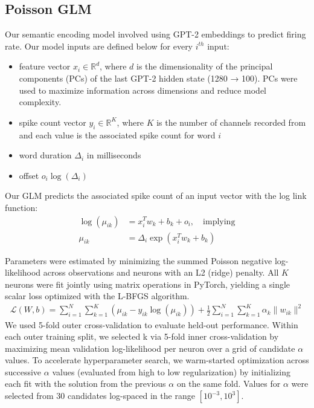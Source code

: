 \documentclass[pdflatex,sn-basic]{sn-jnl}%
\theoremstyle{thmstyleone}%
\theoremstyle{thmstyletwo}%
\theoremstyle{thmstylethree}%
\begin{document}
\subsection{Poisson GLM}\label{subsec8}
Our semantic encoding model involved using GPT-2 embeddings to predict firing rate. Our model inputs are defined below for every $i^{th}$ input:
\begin{itemize}[leftmargin=5em,label=\textendash,itemsep=3pt,topsep=4pt]
  \item feature vector $x_{i}\in \mathbb{R}^d$, where $d$ is the dimensionality of the principal components (PCs) of the last GPT-2 hidden state (1280 → 100). PCs were used to maximize information across dimensions and reduce model complexity.
  \item spike count vector $y_{i}\in \mathbb{R}^K$, where $K$ is the number of channels recorded from and each value is the associated spike count for word $i$
  \item word duration $\Delta_{i}$ in milliseconds
  \item offset $o_i\log(\Delta_i)$
\end{itemize}

Our GLM predicts the associated spike count of an input vector with the log link function:
\[
\begin{aligned}
\log(\mu_{ik}) &= x_i^T w_k + b_k + o_i, \quad \text{implying} \\
\mu_{ik} &= \Delta_i \exp(x_i^T w_k + b_k)
\end{aligned}
\]

Parameters were estimated by minimizing the summed Poisson negative log-likelihood across observations and neurons with an L2 (ridge) penalty. All $K$ neurons were fit jointly using matrix operations in PyTorch, yielding a single scalar loss optimized with the L-BFGS algorithm.
\begin{gather*}
\mathcal{L}(W,b)=\sum_{i=1}^N\sum_{k=1}^K(\mu_{ik}-y_{ik}\log(\mu_{ik}))+\frac{1}{2}\sum_{i=1}^{N}\sum_{k=1}^{K}\alpha_k\lVert w_{ik}\rVert^2
\end{gather*}
We used 5-fold outer cross-validation to evaluate held-out performance. Within each outer training split, we selected k via 5-fold inner cross-validation by maximizing mean validation log-likelihood per neuron over a grid of candidate $\alpha$ values. To accelerate hyperparameter search, we warm-started optimization across successive $\alpha$ values (evaluated from high to low regularization) by initializing each fit with the solution from the previous $\alpha$ on the same fold. Values for $\alpha$ were selected from 30 candidates log-spaced in the range $[10^{-3}, 10^3]$.
\end{document}
